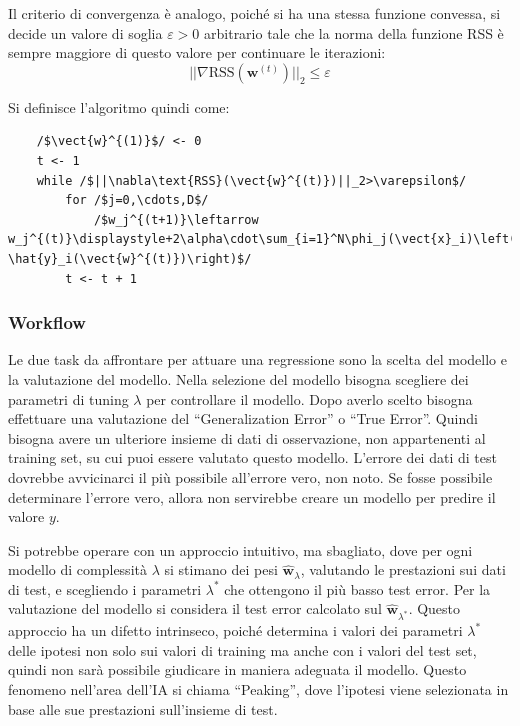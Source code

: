 \documentclass{article}
\numberwithin{equation}{subsection}
\newcommand{\vect}[1]{\boldsymbol{\mathbf{#1}}}
\begin{document}
Il criterio di convergenza è analogo, poiché si ha una stessa funzione convessa, si decide un valore di soglia $\varepsilon>0$ arbitrario tale che la norma della funzione RSS è sempre 
maggiore di questo valore per continuare le iterazioni:
\begin{equation}
    ||\nabla\text{RSS}(\vect{w}^{(t)})||_2\leq\varepsilon
\end{equation}


Si definisce l'algoritmo quindi come:
\begin{verbatim}
    /$\vect{w}^{(1)}$/ <- 0
    t <- 1
    while /$||\nabla\text{RSS}(\vect{w}^{(t)})||_2>\varepsilon$/
        for /$j=0,\cdots,D$/
            /$w_j^{(t+1)}\leftarrow w_j^{(t)}\displaystyle+2\alpha\cdot\sum_{i=1}^N\phi_j(\vect{x}_i)\left(y_i-\hat{y}_i(\vect{w}^{(t)})\right)$/
        t <- t + 1
\end{verbatim}

\subsubsection{Workflow}

Le due task da affrontare per attuare una regressione sono la scelta del modello e la valutazione del modello. Nella selezione del modello bisogna scegliere dei parametri di 
tuning $\lambda$ per controllare il modello. Dopo averlo scelto bisogna effettuare una valutazione del ``Generalization Error'' o ``True Error''. Quindi bisogna avere un ulteriore insieme di dati di osservazione, non appartenenti al training set, su cui puoi essere valutato questo modello. L'errore dei dati di test dovrebbe avvicinarci il più possibile all'errore vero, non noto. Se fosse possibile determinare l'errore vero, allora non servirebbe creare un modello per predire il valore $y$. 

Si potrebbe operare con un approccio intuitivo, ma sbagliato, dove per ogni modello di 
complessità $\lambda$ si stimano dei pesi $\hat{\vect{w}}_\lambda$, valutando le 
prestazioni sui dati di test, e scegliendo i parametri $\lambda^*$ che ottengono il più basso test error. Per la valutazione del modello si considera il test error calcolato sul $\vect{\hat{w}}_{\lambda^*}$. 
Questo approccio ha un difetto intrinseco, poiché determina i valori dei parametri $\lambda^*$ delle ipotesi non solo sui valori di training ma anche con i valori del test set, quindi non sarà possibile giudicare in maniera adeguata il modello. 
Questo fenomeno nell'area dell'IA si chiama ``Peaking'', dove l'ipotesi viene selezionata in base alle sue prestazioni sull'insieme di test. 
\end{document}
